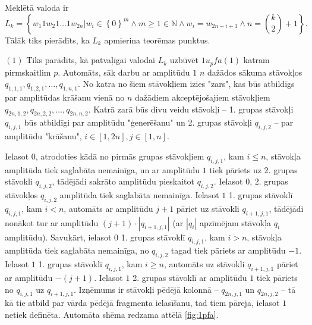 \documentclass{ludis}
\begin{document}
\begin{pieradijums} Meklētā valoda ir
\[
L_k = \left\{ w_1 1 w_2 1 \ldots 1 w_{2n} |
		w_i \in \left\{ 0 \right\}^m \wedge
		m \geq 1 \in \mathbb{N} \wedge
		w_i = w_{2n-i+1} \wedge
		n={k\choose 2}+1 \right\}.
\]
Tālāk tiks pierādīts, ka $L_k$ apmierina teorēmas punktus.

$(1)$ Tiks parādīts, kā patvaļīgai valodai $L_k$ uzbūvēt $1u_pfa(1)$ katram pirmskaitlim $p$. Automāts, sāk darbu ar amplitūdu $1$ $n$ dažādos sākuma stāvokļos $q_{1,1,1},q_{1,2,1},\ldots,q_{1,n,1}$. No katra no šiem stāvokļiem izies "zars", kas būs atbildīgs par amplitūdas krāšanu vienā no $n$ dažādiem akceptējošajiem stāvokļiem $q_{2n,1,2},q_{2n,2,2},\ldots,q_{2n,n,2}$. Katrā zarā būs divu veidu stāvokļi -- 1. grupas stāvokļi $q_{i,j,1}$ būs atbildīgi par amplitūdu "ģenerēšanu" un 2. grupas stāvokļi $q_{i,j,2}$ -- par amplitūdu "krāšanu", $i \in \left[1, 2n \right], j \in \left[1, n \right]$.

Ielasot $0$, atrodoties kādā no pirmās grupas stāvokļiem $q_{i,j,1}$, kam $i \leq n$, stāvokļa amplitūda tiek saglabāta nemainīga, un ar amplitūdu $1$ tiek pāriets uz 2. grupas stāvokli $q_{i,j,2}$, tādējādi sakrāto amplitūdu pieskaitot $q_{i,j,2}$. Ielasot $0$, 2. grupas stāvokļos $q_{i,j,2}$ amplitūda tiek saglabāta nemainīga. Ielasot $1$ 1. grupas stāvoklī $q_{i,j,1}$, kam $i < n$, automāts ar amplitūdu $j + 1$ pāriet uz stāvokli $q_{i + 1,j,1}$, tādējādi nonākot tur ar amplitūdu $(j + 1) \cdot \left| q_{i + 1,j,1} \right|$ (ar $|q_i|$ apzīmējam stāvokļa $q_i$ amplitūdu).
Savukārt, ielasot $0$ 1. grupas stāvoklī $q_{i,j,1}$, kam $i > n$, stāvokļa amplitūda tiek saglabāta nemainīga, no $q_{i,j,2}$ tagad tiek pāriets ar amplitūdu $-1$. Ielasot $1$ 1. grupas stāvoklī $q_{i,j,1}$, kam $i \geq n$, automāts uz stāvokli $q_{i + 1,j,1}$ pāriet ar amplitūdu $-(j + 1)$. Ielasot $1$ 2. grupas stāvoklī ar amplitūdu $1$ tiek pāriets no $q_{i,j,1}$ uz $q_{i + 1,j,1}$. Izņēmums ir stāvokļi pēdējā kolonnā -- $q_{2n,j,1}$ un $q_{2n,j,2}$ -- tā kā tie atbild par vārda pēdējā fragmenta ielasīšanu, tad tiem pāreja, ielasot $1$ netiek definēta. Automāta shēma redzama attēlā \ref{fig:1pfa}.


\end{pieradijums}
\end{document}

